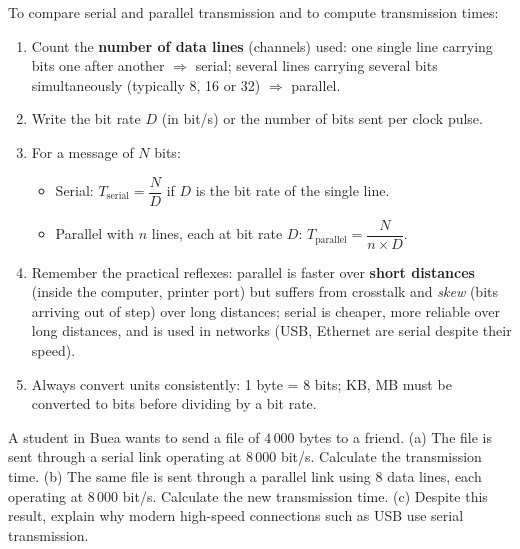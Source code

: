 \documentclass[11pt]{article}
\newcommand{\cle}[1]{{\popxbold\color{popdark}#1}}
\begin{document}
\begin{methode}
To compare \cle{serial} and \cle{parallel} transmission and to compute transmission times:
\begin{enumerate}
\item Count the \textbf{number of data lines} (channels) used: one single line carrying bits one after another $\Rightarrow$ serial; several lines carrying several bits simultaneously (typically 8, 16 or 32) $\Rightarrow$ parallel.
\item Write the \cle{bit rate} $D$ (in bit/s) or the number of bits sent per clock pulse.
\item For a message of $N$ bits:
\begin{itemize}
\item Serial: $T_{\text{serial}} = \dfrac{N}{D}$ if $D$ is the bit rate of the single line.
\item Parallel with $n$ lines, each at bit rate $D$: $T_{\text{parallel}} = \dfrac{N}{n \times D}$.
\end{itemize}
\item Remember the practical reflexes: parallel is faster over \textbf{short distances} (inside the computer, printer port) but suffers from \cle{crosstalk} and \emph{skew} (bits arriving out of step) over long distances; serial is cheaper, more reliable over long distances, and is used in networks (USB, Ethernet are serial despite their speed).
\item Always convert units consistently: 1 byte = 8 bits; KB, MB must be converted to bits before dividing by a bit rate.
\end{enumerate}
\end{methode}

\begin{experience}
A student in Buea wants to send a file of $4\,000$ bytes to a friend. (a) The file is sent through a serial link operating at $8\,000$ bit/s. Calculate the transmission time. (b) The same file is sent through a parallel link using 8 data lines, each operating at $8\,000$ bit/s. Calculate the new transmission time. (c) Despite this result, explain why modern high-speed connections such as USB use serial transmission.
\end{experience}
\end{document}
